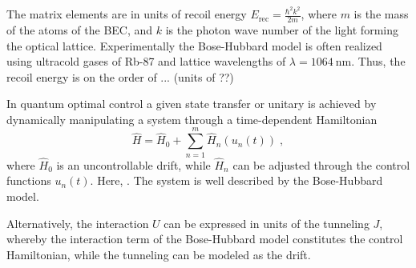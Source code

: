  The matrix elements are in units of recoil energy $E_{\mathrm{rec}} = \frac{\hbar ^2 k^2}{2 m}$, where $m$ is the mass of the atoms of the BEC, and $k$ is the photon wave number of the light forming the optical lattice.
Experimentally the Bose-Hubbard model is often realized using ultracold gases of Rb-87 and lattice wavelengths of $\lambda = 1064 \: \mathrm{nm}$. Thus, the recoil energy is on the order of ... (units of ??)

In quantum optimal control a given state transfer or unitary is achieved by dynamically manipulating a system through a time-dependent Hamiltonian
\begin{equation}
	\hat{H} =  \hat{H}_0 + \sum_{n = 1}^{m}  \hat{H}_n (u_n(t)) \; ,
	\label{eq:ControlHamiltonians}
\end{equation} 
where $\hat{H}_0$ is an uncontrollable drift, while $\hat{H}_n$ can be adjusted through the control functions $u_n(t)$. Here, . The system is well described by the Bose-Hubbard model.

 Alternatively, the interaction $U$ can be expressed in units of the tunneling $J$, whereby the interaction term of the Bose-Hubbard model constitutes the control Hamiltonian, while the tunneling can be modeled as the drift.
